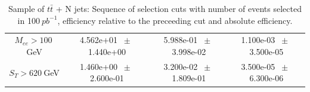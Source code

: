 \begin{table}[htbp]
\begin{center}
\begin{tabular}{|c|c|c|c|}
          $M_{ee}>100~$GeV          &           4.562e+01          $~\pm~$          1.440e+00           &           5.988e-01          $~\pm~$          3.998e-02           &           1.100e-03          $~\pm~$          3.500e-05          \\          
          $ S_T>620~$GeV           &           1.460e+00          $~\pm~$          2.600e-01           &           3.200e-02          $~\pm~$          1.809e-01           &           3.500e-05          $~\pm~$          6.300e-06          \\          
          \hline\hline 
\end{tabular} 
\end{center} 
\caption{Sample of $t\bar{t}$ + N jets: Sequence of selection cuts with number of events selected in 100$~pb^{-1}$, efficiency relative to the preceeding cut and absolute efficiency.} 
\label{tab:effic-ttbar} 
\end{table} 

